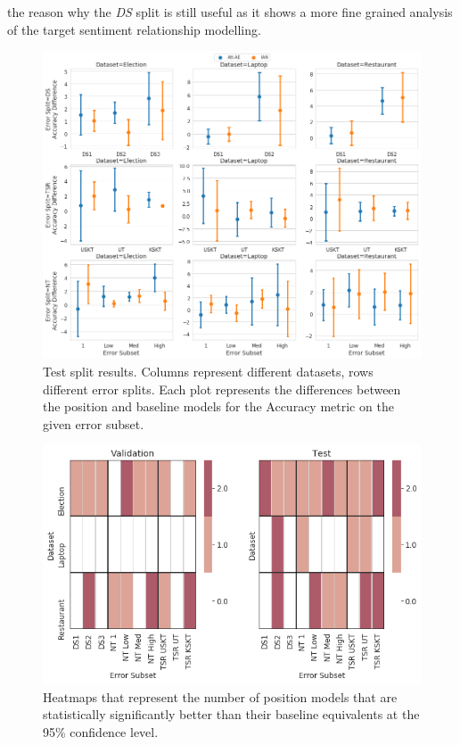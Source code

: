 the reason why the \textit{DS} split is still useful as it shows a more fine grained analysis of the target sentiment relationship modelling. 

\begin{figure}[h!]
    \centering
    \includegraphics[scale=0.32]{images/augmentation/methods_performance/Position_Encoding/position_split_difference_test_results.png}
    \caption{Test split results. Columns represent different datasets, rows different error splits. Each plot represents the differences between the position and baseline models for the Accuracy metric on the given error subset.}
    \label{fig:aug_position_split_difference_test_results}
\end{figure}

\begin{figure}[h!]
    \centering
    \includegraphics[scale=0.5]{images/augmentation/methods_performance/Position_Encoding/position_dataset_subset_heatmap.png}
    \caption{Heatmaps that represent the number of position models that are statistically significantly better than their baseline equivalents at the 95\% confidence level.}
    \label{fig:aug_position_dataset_subset_heatmap}
\end{figure}

